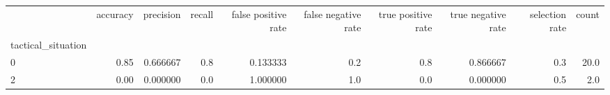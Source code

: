\begin{tabular}{lrrrrrrrrr}
\toprule
{} &  accuracy &  precision &  recall &  false positive rate &  false negative rate &  true positive rate &  true negative rate &  selection rate &  count \\
tactical\_situation &           &            &         &                      &                      &                     &                     &                 &        \\
\midrule
0                  &      0.85 &   0.666667 &     0.8 &             0.133333 &                  0.2 &                 0.8 &            0.866667 &             0.3 &   20.0 \\
2                  &      0.00 &   0.000000 &     0.0 &             1.000000 &                  1.0 &                 0.0 &            0.000000 &             0.5 &    2.0 \\
\bottomrule
\end{tabular}
